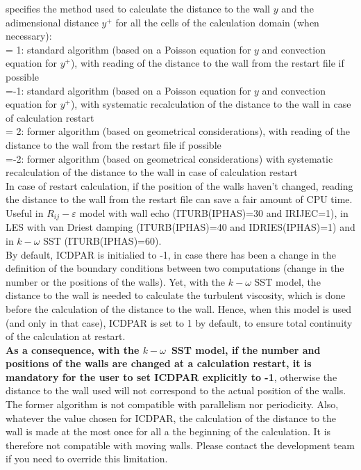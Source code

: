 {specifies the method used to calculate the distance to the wall $y$ and the
adimensional distance $y^+$ for all the
cells of the calculation domain (when necessary):\\ 
\hspace*{1.3cm}= 1: standard algorithm (based on a Poisson equation for $y$ and
convection equation for $y^+$), 
with reading of the distance to the wall from the restart file
if possible\\ 
\hspace*{1.3cm}=-1: standard algorithm (based on a Poisson equation for $y$ and
convection equation for $y^+$),
with systematic recalculation of the distance to the wall in case of
calculation restart\\ 
\hspace*{1.3cm}= 2: former algorithm (based on geometrical
considerations), 
with reading of the distance to the wall from the restart file
if possible\\
\hspace*{1.3cm}=-2: former algorithm (based on geometrical
considerations) with systematic recalculation of the distance to the
wall in case of calculation restart\\
In case of restart calculation, if the position of the walls haven't changed,
reading the distance to the wall from the restart file can save a fair amount of
CPU time.\\
Useful in $R_{ij}-\varepsilon$ model with wall echo (ITURB(IPHAS)=30 and IRIJEC=1),
in LES with van Driest damping (ITURB(IPHAS)=40 and IDRIES(IPHAS)=1) and
in $k-\omega$ SST (ITURB(IPHAS)=60). \\
By default, ICDPAR is initialied to -1, in case there has been a change in the
definition of the boundary conditions between two computations (change in the
number or the positions of the walls). Yet, with the $k-\omega$ SST model, the
distance to the wall is needed to calculate the turbulent viscosity, which is
done before the calculation of the distance to the wall. Hence, when this model
is used (and only in that case), ICDPAR is set to 1 by default, to ensure total
continuity of the calculation at restart.\\
{\bf As a consequence, with the \boldmath$k-\omega$\unboldmath\ SST model, if
the number and positions of the walls are changed at a calculation restart, it
is mandatory for the user to set ICDPAR explicitly to -1}, otherwise the
distance to the wall used will not correspond to the actual position of the
walls.\\
The former algorithm is not compatible with parallelism nor periodicity. Also,
whatever the value chosen for ICDPAR, the calculation of the distance to the
wall is made at the most once for all a the beginning of the calculation. It is
therefore not compatible with moving walls. Please contact the development team
if you need to override this limitation.}


